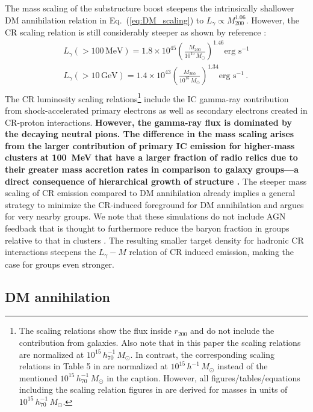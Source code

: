 \documentclass[10pt,aps,pra,reprint,amsmath,amsfonts,amssymb,showpacs,nofootinbib,floatfix]{revtex4-1}
\def\C#1{{\bf #1}}
\newcommand{\rmn}{\mathrm}
\newcommand{\msun}{M_\odot}
\newcommand{\mev}{\rmn{MeV}}
\newcommand{\gev}{\rmn{GeV}}
\newcommand{\rvir}{r_{200}}
\newcommand{\mvir}{M_{200}}
\begin{document}
The mass scaling of the substructure boost steepens the intrinsically
shallower DM annihilation relation in Eq.~(\ref{eq:DM_scaling}) to
$L_\gamma\propto \mvir^{1.06}$.  However, the CR scaling relation is
still considerably steeper as shown by reference
  \cite{2010MNRAS.409..449P}:
\begin{eqnarray}
L_{\gamma}(>100\,\mev) = 1.8\times10^{45}
\left(\frac{\mvir}{10^{15}\,\msun}\right)^{1.46}\mbox{erg~s}^{-1}\nonumber\\
L_{\gamma}(>10\,\gev)  = 1.4\times10^{43}
\left(\frac{\mvir}{10^{15}\,\msun}\right)^{1.34}\mbox{erg~s}^{-1}\,.\nonumber\\
\end{eqnarray}
The CR luminosity scaling relations\footnote{The scaling relations
  show the flux inside $\rvir$ and do not include the contribution
  from galaxies. Also note that in this paper the scaling relations
  are normalized at $10^{15}\,h_{70}^{-1}\,\msun$. In contrast, the
  corresponding scaling relations in Table 5 in
  \cite{2010MNRAS.409..449P} are normalized at
  $10^{15}\,h^{-1}\,\msun$ instead of the mentioned
  $10^{15}\,h_{70}^{-1}\,\msun$ in the caption. However, all
  figures/tables/equations including the scaling relation figures in
  \cite{2010MNRAS.409..449P} are derived for masses in units of
  $10^{15}\,h_{70}^{-1}\,\msun$.}  include the IC gamma-ray
contribution from shock-accelerated primary electrons as well as
secondary electrons created in CR-proton interactions. \C{However, the
  gamma-ray flux is dominated by the decaying neutral pions. The
  difference in the mass scaling arises from the larger contribution
  of primary IC emission for higher-mass clusters at 100~MeV that have
  a larger fraction of radio relics due to their greater mass
  accretion rates in comparison to galaxy groups---a direct
  consequence of hierarchical growth of structure \protect
  \cite{2009ApJ...707..354Z,2011arXiv1106.5505P}.}  The steeper mass
scaling of CR emission compared to DM annihilation already implies a
general strategy to minimize the CR-induced foreground for DM
annihilation and argues for very nearby groups. We note that these
simulations do not include AGN feedback that is thought to furthermore
reduce the baryon fraction in groups relative to that in clusters
\cite{2008ApJ...687L..53P}. The resulting smaller target density for
hadronic CR interactions steepens the $L_\gamma-M$ relation of CR
induced emission, making the case for groups even stronger.

\subsection{DM annihilation}
\end{document}
